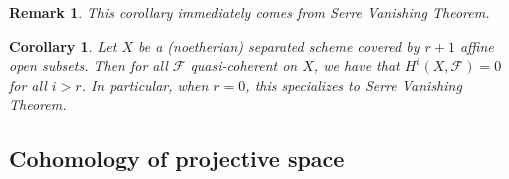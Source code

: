 \documentclass{ctexart}
\newtheorem{remark}{Remark}[section]
\newtheorem{corollary}{Corollary}[section]
\begin{document}
\begin{remark}
    This corollary immediately comes from Serre Vanishing Theorem.
\end{remark}
\begin{corollary}
    Let $X$ be a (noetherian) separated scheme covered by $r + 1$ affine open subsets.
    Then for all $\mathcal{F}$ quasi-coherent on $X$, we have that $H^{i}(X, \mathcal{F}) = 0$ for all $i > r$.
    In particular, when $r = 0$, this specializes to Serre Vanishing Theorem.
    \label{Corollary 2.7}
\end{corollary}

\subsection{Cohomology of projective space}
\label{subsection:Sheaf_Cohomology_Cohomology_of_projective_space}
\end{document}
